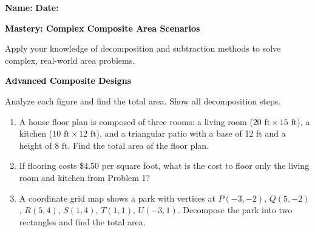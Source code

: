 \documentclass[12pt, letterpaper, fleqn]{article}
\begin{document}
\textbf{Name:} \underline{\hspace{5cm}}
\hfill
\textbf{Date:} \underline{\hspace{3cm}}\\

\begin{tcolorbox}[colback=black!10]
    \large\textcolor{black}{\textbf{Mastery: Complex Composite Area Scenarios}}
\end{tcolorbox}

\vspace{3mm}

\noindent
Apply your knowledge of decomposition and subtraction methods to solve complex, real-world area problems.

\vspace{4mm}

\begin{tcolorbox}[colback=black!10]
\large\textcolor{black}{\textbf{Advanced Composite Designs}}
\end{tcolorbox}

\noindent
Analyze each figure and find the total area. Show all decomposition steps.

\vspace{3mm}

\begin{enumerate}[itemsep=2.2cm, leftmargin=0.6cm]

\item A house floor plan is composed of three rooms: a living room ($20\text{ ft} \times 15\text{ ft}$), a kitchen ($10\text{ ft} \times 12\text{ ft}$), and a triangular patio with a base of 12 ft and a height of 8 ft. Find the total area of the floor plan.

\vspace{2cm}

\item If flooring costs \$4.50 per square foot, what is the cost to floor only the living room and kitchen from Problem 1?

\vspace{2cm}

\item A coordinate grid map shows a park with vertices at $P(-3, -2)$, $Q(5, -2)$, $R(5, 4)$, $S(1, 4)$, $T(1, 1)$, $U(-3, 1)$. Decompose the park into two rectangles and find the total area.

\vspace{2cm}

\end{enumerate}
\end{document}
